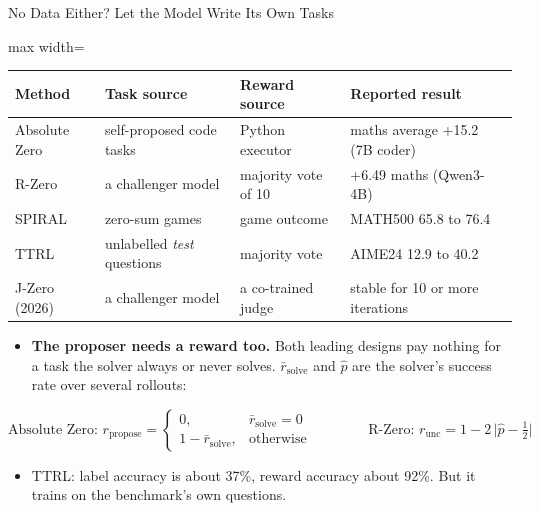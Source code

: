 \begin{frame}{No Data Either? Let the Model Write Its Own Tasks}
    \begin{center}
    \footnotesize
    \renewcommand{\arraystretch}{1.2}
    \begin{adjustbox}{max width=\linewidth}\begin{tabular}{l>{\raggedright\arraybackslash}p{3.7cm}>{\raggedright\arraybackslash}p{3.5cm}>{\raggedright\arraybackslash}p{4.2cm}}
        \toprule
        \textbf{Method} & \textbf{Task source} & \textbf{Reward source} & \textbf{Reported result} \\
        \midrule
        Absolute Zero & self-proposed code tasks & Python executor & maths average +15.2 (7B coder) \\
        R-Zero & a challenger model & majority vote of 10 & +6.49 maths (Qwen3-4B) \\
        SPIRAL & zero-sum games & game outcome & MATH500 65.8 to 76.4 \\
        TTRL & unlabelled \emph{test} questions & majority vote & AIME24 12.9 to 40.2 \\
        \rowcolor{KAUSTcyan!12} J-Zero (2026) & a challenger model & a co-trained judge & stable for 10 or more iterations \\
        \bottomrule
    \end{tabular}\end{adjustbox}
    \end{center}
    \begin{itemize}\itemsep0.35em
        \item \textbf{The proposer needs a reward too.} Both leading designs pay nothing for a task the solver always or never solves. $\bar r_{\text{solve}}$ and $\hat p$ are the solver's success rate over several rollouts:
    \end{itemize}
    {\small\[
        \text{Absolute Zero: } r_{\text{propose}}=\begin{cases}0, & \bar r_{\text{solve}}=0\\ 1-\bar r_{\text{solve}}, & \text{otherwise}\end{cases}
        \qquad\qquad
        \text{R-Zero: } r_{\text{unc}}=1-2\,\big|\hat p-\tfrac12\big|
    \]}
    \begin{itemize}\itemsep0.35em
        \item TTRL: label accuracy is about 37\%, reward accuracy about 92\%. But it trains on the benchmark's own questions.
    \end{itemize}
\end{frame}

